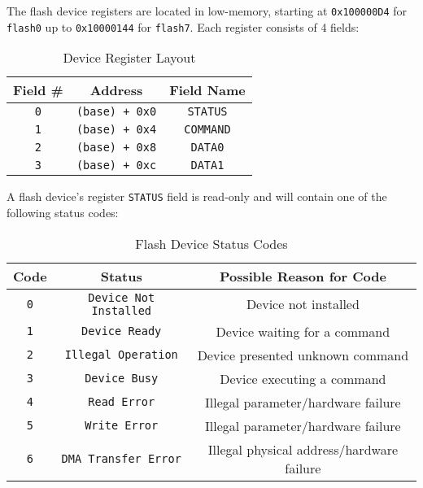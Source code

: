 \documentclass[12pt,a4paper,openright,twoside]{report}
\begin{document}
	The flash device registers are located in low-memory, starting at \texttt{0x100000D4} for \texttt{flash0} up to \texttt{0x10000144} for \texttt{flash7}.
	Each register consists of 4 fields:
	\begin{table}[h]
	\centering
	\begin{tabular}{c|c|c}
	Field \# & Address & Field Name \\  \hline\hline
	\texttt{0} & \texttt{(base) + 0x0} & \texttt{STATUS} \\ \hline
	\texttt{1} & \texttt{(base) + 0x4} & \texttt{COMMAND} \\ \hline
	\texttt{2} & \texttt{(base) + 0x8} & \texttt{DATA0} \\ \hline
	\texttt{3} & \texttt{(base) + 0xc} & \texttt{DATA1}
	\end{tabular}
	\caption{Device Register Layout}
	\end{table}

	A flash device's register \texttt{STATUS} field is read-only and will contain one of the following status codes:
	\begin{table}[h]
	\centering
	\begin{tabular}{c|c|c}
	Code & Status & Possible Reason for Code \\  \hline\hline
	\texttt{0} & \texttt{Device Not Installed} & Device not installed \\ \hline
	\texttt{1} & \texttt{Device Ready} & Device waiting for a command \\ \hline
	\texttt{2} & \texttt{Illegal Operation} & Device presented unknown command \\ \hline
	\texttt{3} & \texttt{Device Busy} & Device executing a command \\ \hline
	\texttt{4} & \texttt{Read Error} & Illegal parameter/hardware failure \\ \hline
	\texttt{5} & \texttt{Write Error} & Illegal parameter/hardware failure \\ \hline
	\texttt{6} & \texttt{DMA Transfer Error} & Illegal physical address/hardware failure
	\end{tabular}
	\caption{Flash Device Status Codes}
	\end{table}
	
\end{document}
